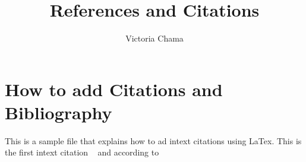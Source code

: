 \documentclass{article}
\title{References and Citations}
\author{Victoria Chama}
\date{}
\begin{document}
	\maketitle
	
	\section{How to add Citations and Bibliography}
	
	This is a sample file that explains how to ad intext citations using LaTex. This is the first intext citation ~\cite{kunda2017analysis} and according to ~\cite{kunda2016design} 
	
	
	
	
	
	
\end{document}
